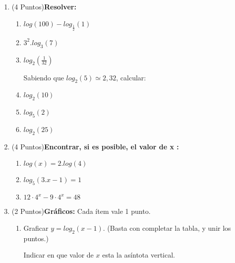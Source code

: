 \documentclass[a4paper,spanish]{exam}
\begin{document}
\begin{enumerate}
\item (4 Puntos)\textbf{Resolver:} 
\begin{multicols}{2}
\begin{enumerate}
\item $log(100)-log_{\frac{1}{2}}(1)$
\item $3^2.{log_3(7)}$
\item $log_2(\frac{1}{32})$

\columnbreak

Sabiendo que $log_2(5)\simeq 2,32$, calcular:

\item $log_2(10)$
\item $log_5(2)$
\item $log_2(25)$


\end{enumerate}
\end{multicols}



\item (4 Puntos)\textbf{Encontrar, si es posible, el valor de x :}
\begin{enumerate}
\item $log(x)=2.log(4)$
\item $log_5(3.x-1)=1$
\item $12 \cdot 4^{x}- 9 \cdot 4^x=48$
\end{enumerate}

\item (2 Puntos)\textbf{Gráficos:}
Cada ítem vale 1 punto.
\begin{enumerate}

\item  Graficar $y=log_{2}(x-1)$. (Basta con completar la tabla, y unir los puntos.)

Indicar en que  valor de $x$ esta la asíntota vertical. 




\end{enumerate}
\end{enumerate}
\end{document}
